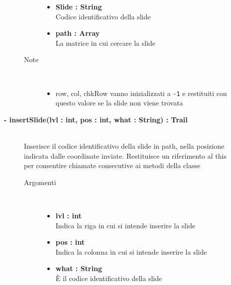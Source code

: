 \begin{description}
\begin{description}
\begin{description}
\begin{itemize}
					\item \textbf{Slide : String		} \hfill \\
					Codice identificativo della slide
					\item \textbf{path : Array		} \hfill \\
					La matrice in cui cercare la slide
					
				\end{itemize}
			\item[Note] \hfill \\
			\begin{itemize}
					\item row, col, chkRow vanno inizializzati a \texttt{-1} e restituiti con questo valore se la slide non viene trovata
			\end{itemize}
		\end{description}
	\end{description}
	
	\begin{description}
		\item[\textbf{\color{blue}- insertSlide(lvl : int, pos : int, what : String) : Trail			}] \hfill \\
			Inserisce il codice identificativo della slide in path, nella posizione indicata dalle coordinate inviate. Restituisce un riferimento al this per consentire chiamate consecutive ai metodi della classe
			
		\begin{description}
			\item[Argomenti] \hfill \\
				\begin{itemize}
				
					\item \textbf{lvl : int		} \hfill \\
					Indica la riga in cui si intende inserire la slide
					\item \textbf{pos : int		} \hfill \\
					Indica la colonna in cui si intende inserire la slide
					\item \textbf{what : String		} \hfill \\
					È il codice identificativo della slide 
					
				\end{itemize}
			
		\end{description}
	\end{description}
	

\end{description}
